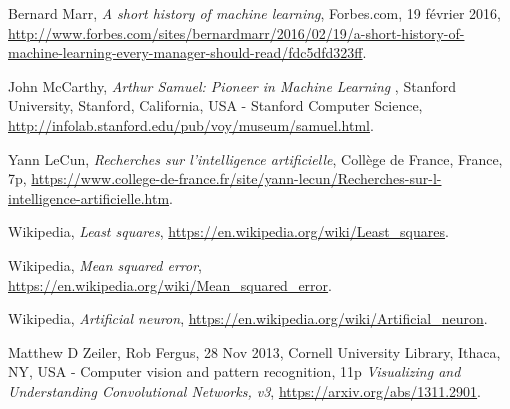 \documentclass[a4paper,10pt]{report}
\begin{document}
\begin{thebibliography}{9}
  Bernard Marr,
  \emph{A short history of machine learning},
  Forbes.com, 19 février 2016,
  \url{http://www.forbes.com/sites/bernardmarr/2016/02/19/a-short-history-of-machine-learning-every-manager-should-read/fdc5dfd323ff}.
  
  John McCarthy,
  \emph{Arthur Samuel: Pioneer in Machine Learning },
  Stanford University, Stanford, California, USA -
  Stanford Computer Science, 
  \url{http://infolab.stanford.edu/pub/voy/museum/samuel.html}.
  

  Yann LeCun,
  \emph{Recherches sur l'intelligence artificielle},
  Collège de France, France,
  7p,
  \url{https://www.college-de-france.fr/site/yann-lecun/Recherches-sur-l-intelligence-artificielle.htm}.

  Wikipedia,
  \emph{Least squares},
  \url{https://en.wikipedia.org/wiki/Least_squares}.
  
  Wikipedia,
  \emph{Mean squared error},
  \url{https://en.wikipedia.org/wiki/Mean_squared_error}.

  Wikipedia,
  \emph{Artificial neuron},
  \url{https://en.wikipedia.org/wiki/Artificial_neuron}.
  
  Matthew D Zeiler, Rob Fergus, 
  28 Nov 2013, 
  Cornell University Library, Ithaca, NY, USA - 
  Computer vision and pattern recognition,
  11p
  \emph{Visualizing and Understanding Convolutional Networks, v3},
  \url{https://arxiv.org/abs/1311.2901}.
  \end{thebibliography}
\end{document}
